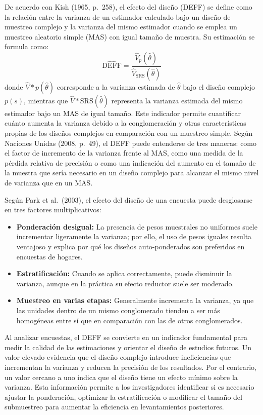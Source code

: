 \documentclass[
  12pt,
]{book}
\providecommand{\tightlist}{%
  \setlength{\itemsep}{0pt}\setlength{\parskip}{0pt}}
\begin{document}
De acuerdo con Kish (1965, p.~258), el efecto del diseño (DEFF) se define como la relación entre la varianza de un estimador calculado bajo un diseño de muestreo complejo y la varianza del mismo estimador cuando se emplea un muestreo aleatorio simple (MAS) con igual tamaño de muestra. Su estimación se formula como:
\[\widehat{\text{DEFF}} = \frac{\widehat{V}_{p}(\hat{\theta})}{\widehat{V}_{\text{SRS}}(\hat{\theta})}\]
donde
\(\widehat{V}*{p}(\hat{\theta})\) corresponde a la varianza estimada de \(\hat{\theta}\) bajo el diseño complejo \(p(s)\), mientras que \(\widehat{V}*{\text{SRS}}(\hat{\theta})\)
representa la varianza estimada del mismo estimador bajo un MAS de igual tamaño. Este indicador permite cuantificar cuánto aumenta la varianza debido a la conglomeración y otras características propias de los diseños complejos en comparación con un muestreo simple. Según Naciones Unidas (2008, p.~49), el DEFF puede entenderse de tres maneras: como el factor de incremento de la varianza frente al MAS, como una medida de la pérdida relativa de precisión o como una indicación del aumento en el tamaño de la muestra que sería necesario en un diseño complejo para alcanzar el mismo nivel de varianza que en un MAS.

Según Park et al.~(2003), el efecto del diseño de una encuesta puede desglosarse en tres factores multiplicativos:

\begin{itemize}
\tightlist
\item
  \textbf{Ponderación desigual:} La presencia de pesos muestrales no uniformes suele incrementar ligeramente la varianza; por ello, el uso de pesos iguales resulta ventajoso y explica por qué los diseños auto-ponderados son preferidos en encuestas de hogares.
\item
  \textbf{Estratificación:} Cuando se aplica correctamente, puede disminuir la varianza, aunque en la práctica su efecto reductor suele ser moderado.
\item
  \textbf{Muestreo en varias etapas:} Generalmente incrementa la varianza, ya que las unidades dentro de un mismo conglomerado tienden a ser más homogéneas entre sí que en comparación con las de otros conglomerados.
\end{itemize}

Al analizar encuestas, el DEFF se convierte en un indicador fundamental para medir la calidad de las estimaciones y orientar el diseño de estudios futuros. Un valor elevado evidencia que el diseño complejo introduce ineficiencias que incrementan la varianza y reducen la precisión de los resultados. Por el contrario, un valor cercano a uno indica que el diseño tiene un efecto mínimo sobre la varianza. Esta información permite a los investigadores identificar si es necesario ajustar la ponderación, optimizar la estratificación o modificar el tamaño del submuestreo para aumentar la eficiencia en levantamientos posteriores.
\end{document}
